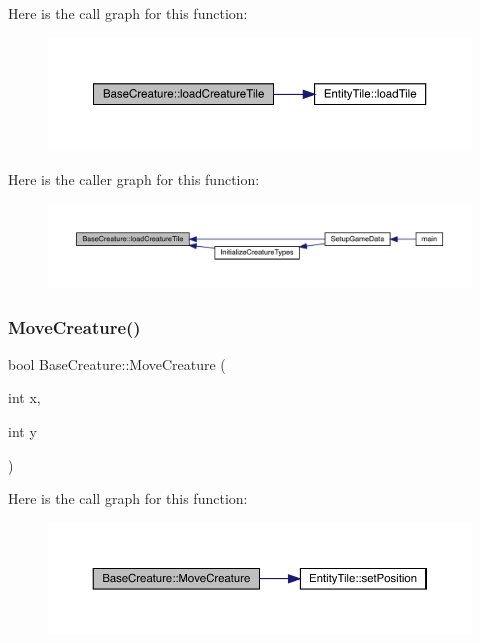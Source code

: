 Here is the call graph for this function\+:
\nopagebreak
\begin{figure}[H]
\begin{center}
\leavevmode
\includegraphics[width=350pt]{class_base_creature_af2066b8eb62bf595d30feae6671e4495_cgraph}
\end{center}
\end{figure}
Here is the caller graph for this function\+:
\nopagebreak
\begin{figure}[H]
\begin{center}
\leavevmode
\includegraphics[width=350pt]{class_base_creature_af2066b8eb62bf595d30feae6671e4495_icgraph}
\end{center}
\end{figure}
\mbox{\label{class_base_creature_a77f0a7d7c441406c252c3278817454d8}} 
\subsubsection{\texorpdfstring{Move\+Creature()}{MoveCreature()}}
{\footnotesize\ttfamily bool Base\+Creature\+::\+Move\+Creature (\begin{DoxyParamCaption}\item[{int}]{x,  }\item[{int}]{y }\end{DoxyParamCaption})}

Here is the call graph for this function\+:
\nopagebreak
\begin{figure}[H]
\begin{center}
\leavevmode
\includegraphics[width=350pt]{class_base_creature_a77f0a7d7c441406c252c3278817454d8_cgraph}
\end{center}
\end{figure}
\mbox{\label{class_base_creature_a2d45724079ff2eeb6606b222e405e4a8}} 
